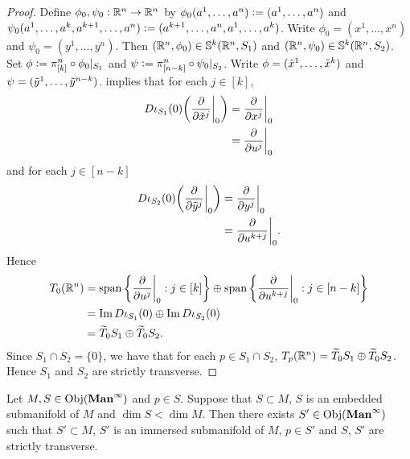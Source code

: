 \documentclass{book}
\begin{document}
	\begin{proof}
		Define $\phi_0, \psi_0: \mathbb{R}^n \rightarrow \mathbb{R}^n$ by $\phi_0(a^1, \ldots, a^n) \vcentcolon= (a^1, \ldots, a^n)$ and $\psi_0(a^1, \ldots, a^k, a^{k+1}, \ldots, a^n) \vcentcolon= (a^{k+1}, \ldots, a^n, a^1, \ldots, a^k)$. Write $\phi_0 = (x^1, \ldots, x^n)$ and $\psi_0 = (y^1, \ldots, y^n)$. Then $(\mathbb{R}^n, \phi_0) \in \mathbb{S}^k(\mathbb{R}^n, S_1)$ and $(\mathbb{R}^n, \psi_0) \in \mathbb{S}^k(\mathbb{R}^n, S_2)$. Set $\phi \vcentcolon= \pi^n_{[k]} \circ \phi_0|_{S_1}$ and $\psi \vcentcolon= \pi^n_{[n-k]} \circ \psi_0|_{S_2}$. Write $\phi = (\tilde{x}^1, \ldots, \tilde{x}^k)$ and $\psi = (\tilde{y}^1, \ldots, \tilde{y}^{n-k})$.  implies that for each $j \in [k]$,
		\begin{align*}
			D \iota_{S_1}(0) \bigg( \frac{\partial}{\partial \tilde{x}^j} \bigg|_0 \bigg) 
			& =  \frac{\partial}{\partial x^j} \bigg|_0 \\
			& = \frac{\partial}{\partial u^j} \bigg|_0 
		\end{align*}
		and for each $j \in [n-k]$
		\begin{align*}
			D \iota_{S_2}(0) \bigg( \frac{\partial}{\partial \tilde{y}^j} \bigg|_0 \bigg) 
			& =  \frac{\partial}{\partial y^j} \bigg|_0 \\
			& = \frac{\partial}{\partial u^{k+j}} \bigg|_0.
		\end{align*}
		Hence 
		\begin{align*}
			T_0(\mathbb{R}^n)
			& = \operatorname{span} \bigg \{  \frac{\partial}{\partial u^j} \bigg|_0  : j \in [k] \bigg \} \oplus \operatorname{span} \bigg \{  \frac{\partial}{\partial u^{k+j}} \bigg|_0  : j \in [n-k] \bigg \} \\
			& = \text{Im} \, D\iota_{S_1}(0) \oplus \text{Im} \, D\iota_{S_2}(0) \\
			& = \widetilde{T}_0S_1 \oplus \widetilde{T}_0S_2.
		\end{align*}
		Since $S_1 \cap S_2 = \{0\}$, we have that for each $p \in S_1 \cap S_2$, $T_p(\mathbb{R}^n) = \widetilde{T}_0S_1 \oplus \widetilde{T}_0S_2$. Hence $S_1$ and $S_2$ are strictly transverse. 
	\end{proof}



	\begin{ex} 
		Let $M, S \in \operatorname{Obj}(\operatorname*{\text{\textbf{Man}}^{\infty}})$ and $p \in S$. Suppose that $S \subset M$, $S$ is an embedded submanifold of $M$ and $\dim S < \dim M$. Then there exists $S' \in \operatorname{Obj}(\operatorname*{\text{\textbf{Man}}^{\infty}})$ such that $S' \subset M$, $S'$ is an immersed submanifold of $M$, $p \in S'$ and $S$, $S'$ are strictly transverse. 
	\end{ex}
\end{document}
